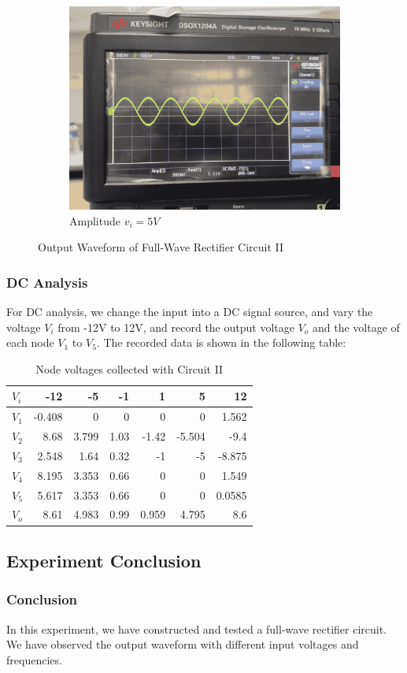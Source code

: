 \begin{figure}[H]
\begin{subfigure}{0.3\linewidth}
            \includegraphics[width=1\linewidth]{Experiment_14/Images/lab14_5v.png}
            \caption{Amplitude $v_i=5V$}
            \label{wave:14-AC5}
        \end{subfigure}


        \caption{Output Waveform of Full-Wave Rectifier Circuit II}
    \end{figure}
    \FloatBarrier

    \subsubsection{DC Analysis}
        For DC analysis, we change the input into a DC signal source, and vary the voltage $V_i$ from -12V to 12V, and record the output voltage $V_o$ and the voltage of each node $V_1$ to $V_5$. The recorded data is shown in the following table:
    \begin{table}[H]
        \centering
    \begin{tabular}{l|rrrrrr}
        $V_i$  & -12   & -5    & -1    & 1     & 5     & 12 \\
        \midrule
        $V_1$   & -0.408 & 0     & 0     & 0     & 0     & 1.562 \\
        $V_2$   & 8.68  & 3.799 & 1.03  & -1.42 & -5.504 & -9.4 \\
        $V_3$   & 2.548 & 1.64  & 0.32  & -1    & -5    & -8.875 \\
        $V_4$   & 8.195 & 3.353 & 0.66  & 0     & 0     & 1.549 \\
        $V_5$   & 5.617 & 3.353 & 0.66  & 0     & 0     & 0.0585 \\
        $V_o$   & 8.61  & 4.983 & 0.99  & 0.959 & 4.795 & 8.6 \\
        \end{tabular}%
        \caption{Node voltages collected with Circuit II}
    \end{table}
\subsection{Experiment Conclusion}
    \subsubsection{Conclusion}
    In this experiment, we have constructed and tested a full-wave rectifier circuit. We have observed the output waveform with different input voltages and frequencies.